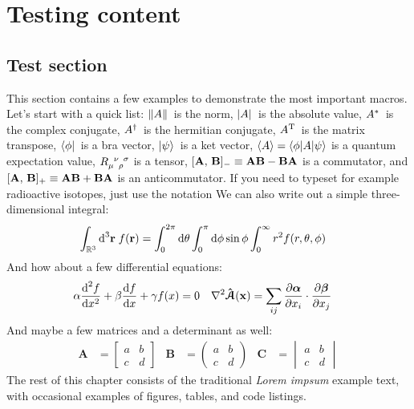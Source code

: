 \chapter{Testing content}
\section{Test section}
This section contains a few examples to demonstrate the most important macros.
Let's start with a quick list:
$\| A \|$~is the norm,
$| A |$~is the absolute value,
${A}^*$~is the complex conjugate,
${A}^\dagger$~is the hermitian conjugate,
${A}^\mathrm{T}$~is the matrix transpose,
$\bra{\phi}$~is a bra vector,
$\ket{\psi}$~is a ket vector,
$\langle A \rangle = \braket{\phi|A|\psi}$ is a quantum expectation value,
$\tensor{R}{_\mu^\nu_\rho^\sigma}$ is a tensor,
$[{\mathbf{A}},\,{\mathbf{B}}]_- \equiv \mathbf{A}\mathbf{B} - \mathbf{B}\mathbf{A}$ is a commutator, and $[{\mathbf{A}},\,{\mathbf{B}}]_+ \equiv \mathbf{A}\mathbf{B} + \mathbf{B}\mathbf{A}$ is an anticommutator.
If you need to typeset for example radioactive isotopes, just use the notation%
We can also write out a simple three-dimensional integral:
\begin{align}
	\label{eq:integral}
	\int_{\mathbb{R}^3} \text{d}^3\mathbf{r}\; f(\mathbf{r}) &= \int_0^{2\pi} \text{d}{\theta} \int_0^\pi \text{d}{\phi} \sin\phi \int_0^\infty r^2 f(r,\theta,\phi)
\end{align}
And how about a few differential equations:
\begin{align}
	\label{eq:diffeq}
	\alpha \frac{\text{d}^2 f}{\text{d} x^2} + \beta \frac{\text{d} f}{\text{d} x} + \gamma f(x)  &= 0 &
	 \nabla^2 \boldsymbol{\hat{\mathcal A}}(\mathbf x) &= \sum_{ij} \frac{\partial \boldsymbol\alpha}{\partial x_i} \cdot \frac{\partial \boldsymbol\beta}{\partial x_j}
\end{align}
And maybe a few matrices and a determinant as well:
\begin{align}
	\label{eq:matrices}
	\mathbf{A} &= \begin{bmatrix} a & b \\ c & d \end{bmatrix} &
	\mathbf{B} &= \begin{pmatrix} a & b \\ c & d \end{pmatrix} &
	\mathbf{C} &= \begin{vmatrix} a & b \\ c & d \end{vmatrix} 
\end{align}
The rest of this chapter consists of the traditional \emph{Lorem impsum} example text, with occasional examples of figures, tables, and code listings.

